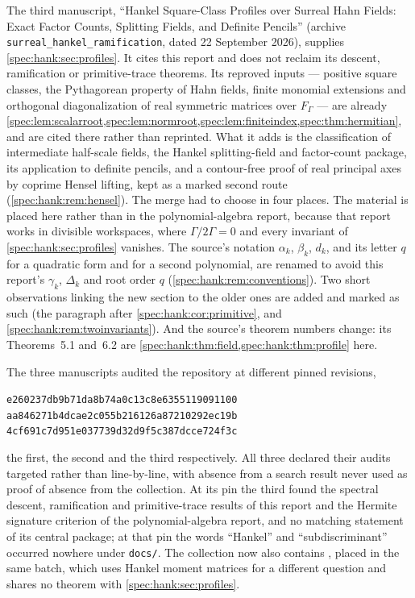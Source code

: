 \documentclass[11pt,a4paper]{article}
\numberwithin{equation}{section}
\theoremstyle{definition}
\theoremstyle{remark}
\newcommand{\repocommit}{e260237db9b71da8b74a0c13c8e6355119091100}
\begin{document}
The third manuscript, ``Hankel Square-Class Profiles over Surreal Hahn
Fields: Exact Factor Counts, Splitting Fields, and Definite Pencils''
(archive \texttt{surreal\_hankel\_ramification}, dated 22 September 2026),
supplies \cref{spec:hank:sec:profiles}. It cites this report and does not
reclaim its descent, ramification or primitive-trace theorems. Its reproved
inputs --- positive square classes, the Pythagorean property of Hahn fields,
finite monomial extensions and orthogonal diagonalization of real symmetric
matrices over $F_\Gamma$ --- are already
\cref{spec:lem:scalarroot,spec:lem:normroot,spec:lem:finiteindex,spec:thm:hermitian},
and are cited there rather than reprinted. What it adds is the
classification of intermediate half-scale fields, the Hankel splitting-field
and factor-count package, its application to definite pencils, and a
contour-free proof of real principal axes by coprime Hensel lifting, kept as a
marked second route (\cref{spec:hank:rem:hensel}). The merge had to choose in
four places. The material is placed here rather than in the
polynomial-algebra report, because that report works in divisible
workspaces, where $\Gamma/2\Gamma=0$ and every invariant of
\cref{spec:hank:sec:profiles} vanishes. The source's notation $\alpha_k$,
$\beta_k$, $d_k$, and its letter $q$ for a quadratic form and for a second
polynomial, are renamed to avoid this report's $\gamma_k$, $\Delta_k$ and root
order $q$
(\cref{spec:hank:rem:conventions}). Two short observations linking the new
section to the older ones are added and marked as such (the paragraph after
\cref{spec:hank:cor:primitive}, and \cref{spec:hank:rem:twoinvariants}). And the
source's theorem numbers change: its Theorems~5.1 and~6.2 are
\cref{spec:hank:thm:field,spec:hank:thm:profile} here.

The three manuscripts audited the repository at different pinned revisions,
\begin{center}\small
\texttt{\repocommit}\\
\nolinkurl{aa846271b4dcae2c055b216126a87210292ec19b}\\
\nolinkurl{4cf691c7d951e037739d32d9f5c387dcce724f3c}
\end{center}
the first, the second and the third respectively. All three declared their
audits targeted rather than line-by-line, with absence from a search result
never used as proof of absence from the collection. At its pin the third
found the spectral descent, ramification and primitive-trace results of this
report and the Hermite signature criterion of the polynomial-algebra report,
and no matching statement of its central package; at that pin the words
``Hankel'' and ``subdiscriminant'' occurred nowhere under \texttt{docs/}. The
collection now also contains
, placed in the
same batch, which uses Hankel moment matrices for a different question and
shares no theorem with \cref{spec:hank:sec:profiles}.
\end{document}
